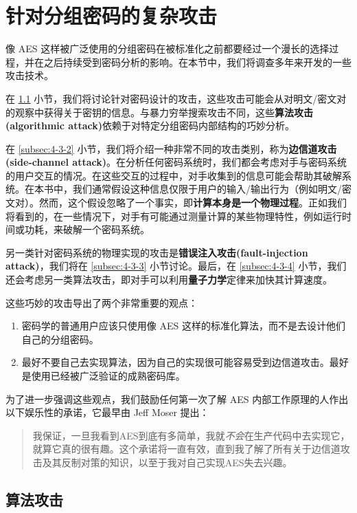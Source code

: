 \section{针对分组密码的复杂攻击}\label{sec:4-3}

像 AES 这样被广泛使用的分组密码在被标准化之前都要经过一个漫长的选择过程，并在之后持续受到密码分析的影响。在本节中，我们将调查多年来开发的一些攻击技术。

在 \ref{subsec:4-3-1} 小节，我们将讨论针对密码设计的攻击，这些攻击可能会从对明文/密文对的观察中获得关于密钥的信息。与暴力穷举搜索攻击不同，这些\textbf{算法攻击(algorithmic attack)}依赖于对特定分组密码内部结构的巧妙分析。

在 \ref{subsec:4-3-2} 小节，我们将介绍一种非常不同的攻击类别，称为\textbf{边信道攻击(side-channel attack)}。在分析任何密码系统时，我们都会考虑对手与密码系统的用户交互的情况。在这些交互的过程中，对手收集到的信息可能会帮助其破解系统。在本书中，我们通常假设这种信息仅限于用户的输入/输出行为（例如明文/密文对）。然而，这个假设忽略了一个事实，即\textbf{计算本身是一个物理过程}。正如我们将看到的，在一些情况下，对手有可能通过测量计算的某些物理特性，例如运行时间或功耗，来破解一个密码系统。

另一类针对密码系统的物理实现的攻击是\textbf{错误注入攻击(fault-injection attack)}，我们将在 \ref{subsec:4-3-3} 小节讨论。最后，在 \ref{subsec:4-3-4} 小节，我们还会考虑另一类算法攻击，即对手可以利用\textbf{量子力学}定律来加快其计算速度。

这些巧妙的攻击导出了两个非常重要的观点：
\begin{enumerate}
	\item 密码学的普通用户应该只使用像 AES 这样的标准化算法，而不是去设计他们自己的分组密码。
	\item 最好不要自己去实现算法，因为自己的实现很可能容易受到边信道攻击。最好是使用已经被广泛验证的成熟密码库。
\end{enumerate}
为了进一步强调这些观点，我们鼓励任何第一次了解 AES 内部工作原理的人作出以下娱乐性的承诺，它最早由 Jeff Moser 提出：
\begin{quote}
我保证，一旦我看到AES到底有多简单，我就\emph{不会}在生产代码中去实现它，就算它真的很有趣。这个承诺将一直有效，直到我了解了所有关于边信道攻击及其反制对策的知识，以至于我对自己实现AES失去兴趣。
\end{quote}

\subsection{算法攻击}\label{subsec:4-3-1}

